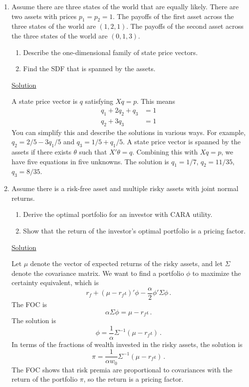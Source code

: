\documentclass[letterpaper,english]{article}
\begin{document}
\begin{enumerate}
\item Assume there are three states of the world that are equally likely.  There are two assets with prices $p_1=p_2=1$.  The payoffs of the first asset across the three states of the world are $(1,2,1)$.  The payoffs of the second asset across the three states of the world are $(0,1,3)$.  
\begin{enumerate}
\item Describe the one-dimensional family of state price vectors.
\item Find the SDF that is spanned by the assets.
\end{enumerate}

\underline{Solution}

A state price vector is $q$ satisfying $Xq = p$.  This means
\begin{align*}
    q_1 + 2q_2 + q_3 &= 1\\
    q_2 + 3q_3 & = 1
\end{align*}
You can simplify this and describe the solutions in various ways.  For example, $q_2 = 2/5 - 3q_1/5$ and $q_3= 1/5 + q_1/5$.  A state price vector is spanned by the assets if there exists $\theta$ such that $X'\theta = q$.  Combining this with $Xq=p$, we have five equations in five unknowns.  The solution is $q_1 = 1/7$, $q_2 = 11/35$, $q_3 = 8/35$.

\item Assume there is a risk-free asset and multiple risky assets with joint normal returns. 
\begin{enumerate}
    \item Derive the optimal portfolio for an investor with CARA utility.
    \item Show that the return of the investor's optimal portfolio is a pricing factor.
\end{enumerate}

\newpage

\underline{Solution}

Let $\mu$ denote the vector of expected returns of the risky assets, and let $\Sigma$ denote the covariance matrix.  We want to find a portfolio $\phi$ to maximize the certainty equivalent, which is
$$r_f + (\mu-r_f\iota)'\phi - \frac{\alpha}{2}\phi'\Sigma\phi\,.$$
The FOC is
$$\alpha \Sigma \phi = \mu-r_f\iota\,.$$
The solution is 
$$\phi = \frac{1}{\alpha}\Sigma^{-1}(\mu-r_f\iota)\,.$$
In terms of the fractions of wealth invested in the risky assets, the solution is
$$\pi = \frac{1}{\alpha w_0}\Sigma^{-1}(\mu-r_f\iota)\,.$$
The FOC shows that risk premia are proportional to covariances with the return of the portfolio $\pi$, so the return is a pricing factor.


\end{enumerate}
\end{document}
